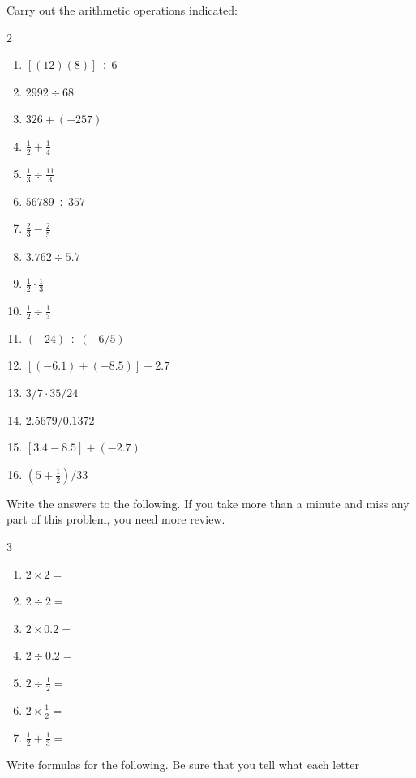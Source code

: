 \documentclass[11pt]{book}
\begin{document}
\begin{exlist}
\item Carry out the arithmetic operations indicated:
  \begin{multicols}{2}
  \begin{enumerate}[label=(\alph*), leftmargin=2.2em, itemsep=1pt, topsep=2pt]
  \item $[(12)(8)] \div 6$
  \item $2992 \div 68$
  \item $326 + (-257)$
  \item $\frac{1}{2} + \frac{1}{4}$
  \item $\frac{1}{3} \div \frac{11}{3}$
  \item $56789 \div 357$
  \item $\frac{2}{3} - \frac{2}{5}$
  \item $3.762 \div 5.7$
  \item $\frac{1}{2} \cdot \frac{1}{3}$
  \item $\frac{1}{2} \div \frac{1}{3}$
  \item $(-24) \div (-6/5)$
  \item $[(-6.1) + (-8.5)] - 2.7$
  \item $3/7 \cdot 35/24$
  \item $2.5679/0.1372$
  \item $[3.4 - 8.5] + (-2.7)$
  \item $(5 + \frac{1}{2})/33$
  \end{enumerate}
  \end{multicols}
\item Write the answers to the following. If you take more than a minute and miss
      any part of this problem, you need more review.
  \begin{multicols}{3}
  \begin{enumerate}[label=(\alph*), leftmargin=2.2em, itemsep=1pt, topsep=2pt]
  \item $2 \times 2 =$
  \item $2 \div 2 =$
  \item $2 \times 0.2 =$
  \item $2 \div 0.2 =$
  \item $2 \div \frac{1}{2} =$
  \item $2 \times \frac{1}{2} =$
  \item $\frac{1}{2} + \frac{1}{3} =$
  \end{enumerate}
  \end{multicols}
\item Write formulas for the following. Be sure that you tell what each letter

\end{exlist}
\end{document}
